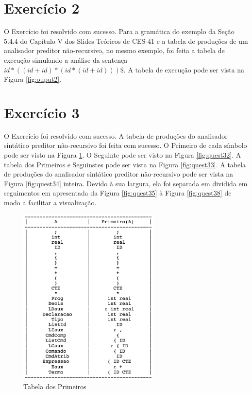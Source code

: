 \documentclass[a4paper, 10pt]{article}
\begin{document}
\section*{Exercício 2}

O Exercício foi resolvido com sucesso. Para a gramática do exemplo da Seção 5.4.4 do Capítulo V dos Slides Teóricos de CES-41 e a tabela de produções de um analisador preditor não-recursivo, no mesmo exemplo, foi feita a tabela de execução simulando a análise da sentença $id * ((id + id) * (id * (id + id))) \$$. A tabela de execução pode ser vista na Figura \ref{fig:ouput2}.

\section*{Exercício 3}

O Exercicio foi resolvido com sucesso. A tabela de produções do analisador sintático preditor não-recursivo foi feita com sucesso. O Primeiro de cada símbolo pode ser visto na Figura \ref{fig:quest31}. O Seguinte pode ser visto na Figura \ref{fig:quest32}. A tabela dos Primeiros e Seguinstes pode ser vista na Figura \ref{fig:quest33}. A tabela de produções do analisador sintático preditor não-recursivo pode ser vista na Figura \ref{fig:quest34} inteira. Devido à sua largura, ela foi separada em dividida em seguimentos em apresentada da Figura \ref{fig:quest35} à Figura \ref{fig:quest38} de modo a facilitar a visualização.

% 

\begin{figure}
  \begin{center}
  \includegraphics[width=2.8in]{./../output/quest31.png}
  \caption{Tabela dos Primeiros}
  \label{fig:quest31}
  \end{center}
\end{figure}
\end{document}
